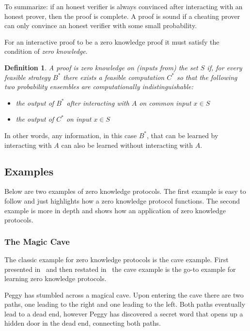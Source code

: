 \documentclass{sig-alternate}
\newtheorem{zeroKnowledge}{Definition}
\begin{document}
		To summarize: if an honest verifier is always convinced after interacting with
		an honest prover, then the proof is complete. A proof is sound if a cheating
		prover can only convince an honest verifier with some small probability.
		
		For an interactive proof to be a zero knowledge proof it must
		satisfy the condition of \textit{zero knowledge}.		
		
		\begin{zeroKnowledge}
			A proof is zero knowledge on (inputs from) the set $S$ if, for every feasible
			strategy $B^{*}$ there exists a feasible computation $C^{*}$ so that the
			following two probability ensembles are computationally indistinguishable:
			
			\begin{itemize}
				\item the output of $B^{*}$ after interacting with $A$ on common input
				$x \in S$
				
				\item the output of $C^{*}$ on input $x \in S$
			\end{itemize}						
			
		\end{zeroKnowledge}
		
		In other words, any information, in this case $B^{*}$, that can be learned by
		interacting with $A$ can also be learned without interacting with
		$A$.~\cite{Survey}

	\subsection{Examples}
	Below are two examples of zero knowledge protocols. The first
	example is easy to follow and just highlights how a zero knowledge
	protocol functions. The second example is more in depth and shows
	how an application of zero knowledge protocols.
	
	\subsubsection{The Magic Cave}
	The classic example for zero knowledge protocols is the cave example.
	First presented in~\cite{Children:1987} and then restated
	in~\cite{Survey} the cave example is the go-to example for learning
	zero knowledge protocols.

	Peggy has stumbled across a magical cave. Upon entering the cave
	there are two paths, one leading to the right and one leading to the
	left. Both paths eventually lead to a dead end, however Peggy has
	discovered a secret word that opens up a hidden door in the dead end,
	connecting both paths.
\end{document}
